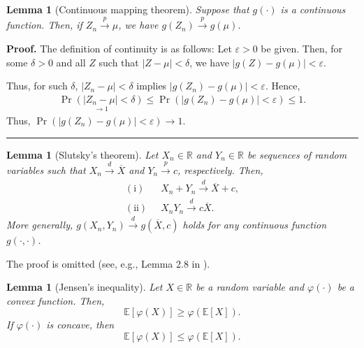 \documentclass[10.5pt, A4paper, openany, uplatex]{book}
\newcommand{\mbb}{\mathbb}
\newcommand{\eps}{\varepsilon}
\newcommand{\E}{\mathbb{E}}
\renewcommand{\bar}{\overline}
\newtheorem{lemma}[theorem]{Lemma}
\newenvironment{proof}[1][Proof]{\textbf{#1.} }{\  \rule{0.5em}{0.5em}}
\numberwithin{equation}{section}
\begin{document}
\begin{appendices}
	\begin{lemma}[Continuous mapping theorem]\label{lem:cmt} 
		Suppose that $g(\cdot)$ is a continuous function.
		Then, if $Z_n \overset{p}{\to} \mu$, we have $g(Z_n) \overset{p}{\to} g(\mu)$.
	\end{lemma}

	\begin{proof}
		The definition of continuity is as follows: 
		Let $\eps > 0$ be given.
		Then, for some $\delta > 0$ and all $Z$ such that $|Z - \mu| < \delta$, we have $|g(Z) - g(\mu) | < \eps$.

		Thus, for such $\delta$, $|Z_n - \mu| < \delta$ implies $|g(Z_n) - g(\mu)| < \eps$.
		Hence,
		\begin{align*}
			\underset{\to 1}{\Pr(|Z_n - \mu| < \delta)} \le \Pr(|g(Z_n) - g(\mu)| < \eps) \le 1.
		\end{align*}
		Thus, $\Pr(|g(Z_n) - g(\mu)| < \eps) \to 1$.
	\end{proof}

	\begin{lemma}[Slutsky's theorem]\label{lem:slutsky}
		Let $X_n \in \mathbb{R}$ and $Y_n \in \mathbb{R}$ be sequences of random variables such that $X_n \overset{d}{\to} \bar X$ and $Y_n \overset{p}{\to} c$, respectively.
		Then,
		\begin{align*}
		\mathrm{(i)} & \;\; X_n + Y_n \overset{d}{\to} \bar X + c,\\
		\mathrm{(ii)} & \;\; X_n Y_n \overset{d}{\to} c \bar X.
		\end{align*}
		More generally, $g(X_n, Y_n) \overset{d}{\to} g(\bar X, c)$ holds for any continuous function $g(\cdot, \cdot)$. 
	\end{lemma}
	The proof is omitted (see, e.g., Lemma 2.8 in \cite{van2000asymptotic}).
	
	\begin{lemma}[Jensen's inequality]\label{lem:Jensen}
		 Let $X \in \mbb{R}$ be a random variable and $\varphi(\cdot)$ be a convex function.
		 Then,
		\[
			\E[\varphi(X)] \ge \varphi(\E[X]). 
		\]
		If $\varphi(\cdot)$ is concave, then
		\[
			\E[\varphi(X)] \le \varphi(\E[X]). 
		\]
	\end{lemma}
	

\end{appendices}
\end{document}

